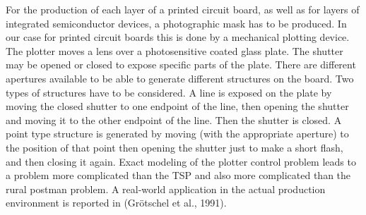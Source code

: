 For the production of each layer of a printed circuit board, as well as for layers of integrated semiconductor devices, a photographic mask has to be produced. In our case for printed circuit boards this is done by a mechanical plotting device. The plotter moves a lens over a photosensitive coated glass plate. The shutter may be opened or closed to expose specific parts of the plate. There are different apertures available to be able to generate different structures on the board. Two types of structures have to be considered. A line is exposed on the plate by moving the closed shutter to one endpoint of the line, then opening the shutter and moving it to the other endpoint of the line. Then the shutter is closed. A point type structure is generated by moving (with the appropriate aperture) to the position of that
point then opening the shutter just to make a short flash, and then closing it again. Exact modeling of the plotter control problem leads to a problem more complicated than the TSP and also more complicated than the rural postman problem. A real-world application in the actual production environment is reported in (Grötschel et al., 1991).
